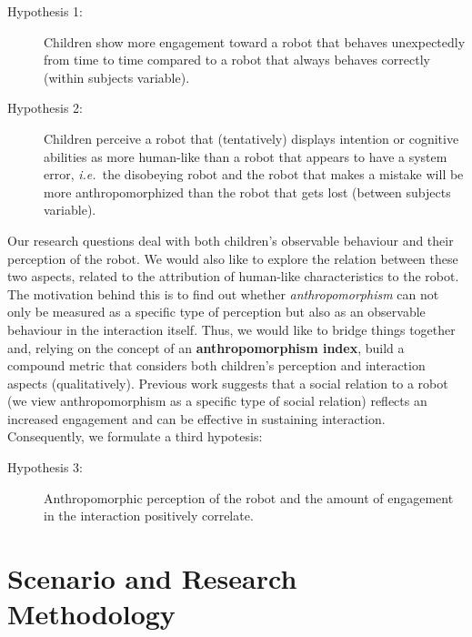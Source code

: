 \documentclass{sig-alternate}
\newcommand{\ie}{{\textit{i.e.~}}}
\begin{document}
\begin{description}

    \item[Hypothesis 1:] Children show more engagement toward a robot that
        behaves unexpectedly from time to time compared to a robot that always
        behaves correctly (within subjects variable).

    \item[Hypothesis 2:] Children perceive a robot that (tentatively) displays
        intention or cognitive abilities as more human-like than a robot that
        appears to have a system error, \ie the disobeying robot and the robot
        that makes a mistake will be more anthropomorphized than the robot that
        gets lost (between subjects variable).

\end{description}

Our research questions deal with both children's observable behaviour and their
perception of the robot. We would also like to explore the relation between
these two aspects, related to the attribution of human-like characteristics to
the robot. The motivation behind this is to find out whether
\textit{anthropomorphism} can not only be measured as a specific type of
perception but also as an observable behaviour in the interaction itself. Thus,
we would like to bridge things together and, relying on the concept of an
\textbf{anthropomorphism index}, build a
compound metric that considers both children's perception and interaction
aspects (qualitatively). Previous work suggests that a social relation to a
robot (we view anthropomorphism as a specific type of social relation) reflects
an increased engagement and can be effective in sustaining interaction.
Consequently, we formulate a third hypotesis:

\begin{description}

    \item[Hypothesis 3:] Anthropomorphic perception of the robot and the amount
    of engagement in the interaction positively correlate.

\end{description}



\section{Scenario and Research Methodology}
\end{document}
